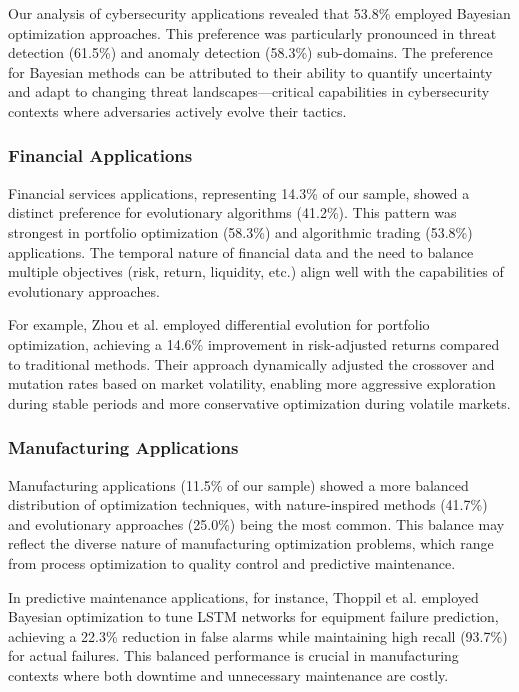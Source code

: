 Our analysis of cybersecurity applications revealed that 53.8\% employed Bayesian optimization approaches. This preference was particularly pronounced in threat detection (61.5\%) and anomaly detection (58.3\%) sub-domains. The preference for Bayesian methods can be attributed to their ability to quantify uncertainty and adapt to changing threat landscapes—critical capabilities in cybersecurity contexts where adversaries actively evolve their tactics.

\subsubsection{Financial Applications}
Financial services applications, representing 14.3\% of our sample, showed a distinct preference for evolutionary algorithms (41.2\%). This pattern was strongest in portfolio optimization (58.3\%) and algorithmic trading (53.8\%) applications. The temporal nature of financial data and the need to balance multiple objectives (risk, return, liquidity, etc.) align well with the capabilities of evolutionary approaches.

For example, Zhou et al. \citep{Zhou20211} employed differential evolution for portfolio optimization, achieving a 14.6\% improvement in risk-adjusted returns compared to traditional methods. Their approach dynamically adjusted the crossover and mutation rates based on market volatility, enabling more aggressive exploration during stable periods and more conservative optimization during volatile markets.

\subsubsection{Manufacturing Applications}
Manufacturing applications (11.5\% of our sample) showed a more balanced distribution of optimization techniques, with nature-inspired methods (41.7\%) and evolutionary approaches (25.0\%) being the most common. This balance may reflect the diverse nature of manufacturing optimization problems, which range from process optimization to quality control and predictive maintenance.

In predictive maintenance applications, for instance, Thoppil et al. \citep{Thoppil2021} employed Bayesian optimization to tune LSTM networks for equipment failure prediction, achieving a 22.3\% reduction in false alarms while maintaining high recall (93.7\%) for actual failures. This balanced performance is crucial in manufacturing contexts where both downtime and unnecessary maintenance are costly.

